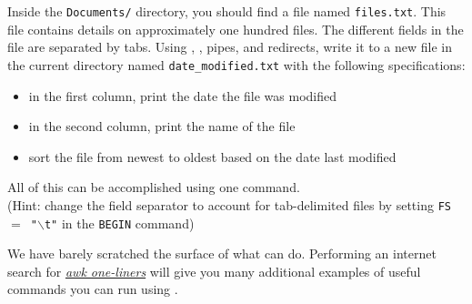 \begin{problem}
Inside the \texttt{Documents/} directory, you should find a file named \texttt{files.txt}.
This file contains details on approximately one hundred files.
The different fields in the file are separated by tabs.
Using , , pipes, and redirects, write it to a new file in the current directory named \texttt{date\_modified.txt} with the following specifications:
\begin{itemize}
\item in the first column, print the date the file was modified
\item in the second column, print the name of the file
\item sort the file from newest to oldest based on the date last modified
\end{itemize}
All of this can be accomplished using one command.
\\(Hint: change the field separator to account for tab-delimited files by setting \texttt{FS $=$ "$\backslash$t"} in the \texttt{BEGIN} command)
\end{problem}

\begin{comment}
\begin{problem}
The \texttt{people\_info.txt} file contains a list of info about specific people.
Each person has a gender, occupation, name, and age.
Listed in that order.

The formatting in this file is a little different, because each piece of info is separated by a comma instead of a space.
Using what you learned in the previous discussion, as an awk command to format the data as follows; \emph{gender,age,name,occupation}, with the gender left justified, the age right, the name left, and the occupation printed to its full length. 
Note that the names in this file are no longer than six letters.
Write the results of your command to a different file called \texttt{people\_formatted.txt}.
\\(Hint: To change the field separator change the \texttt{FS $=$} part of the command. )
\end{problem}
\end{comment}

We have barely scratched the surface of what  can do.
Performing an internet search for \href{https://www.google.com/search?q=awk+one-liners&oq=awk+one-liners&aqs=chrome..69i57j0l7.3924j0j7&sourceid=chrome&ie=UTF-8}{\emph{awk one-liners}} will give you many additional examples of useful commands you can run using .

